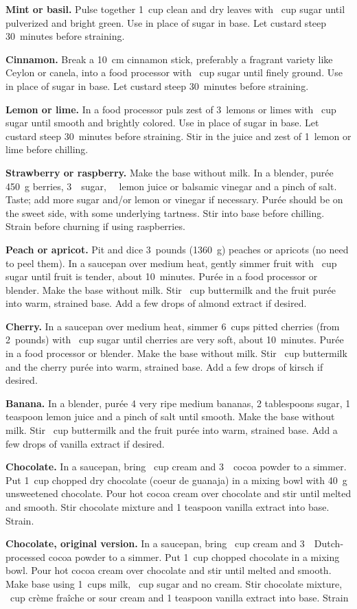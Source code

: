 \textbf{Mint or basil.}  Pulse together 1~cup clean and dry leaves
with \fracTT~cup sugar until pulverized and bright green.  Use in
place of sugar in base.  Let custard steep 30~minutes before
straining.

\textbf{Cinnamon.}  Break a 10~cm cinnamon stick, preferably a
fragrant variety like Ceylon or canela, into a food processor with
\fracTT~cup sugar until finely ground.  Use in place of sugar in base.
Let custard steep 30~minutes before straining.

\textbf{Lemon or lime.}  In a food processor puls zest of 3~lemons or
limes with \fracTT~cup sugar until smooth and brightly colored.  Use
in place of sugar in base.  Let custard steep 30~minutes before
straining.  Stir in the juice and zest of 1~lemon or lime before
chilling.

\textbf{Strawberry or raspberry.}  Make the base without milk. In a
blender, purée 450~g berries, 3~\tbsp~sugar, \fracH~\tsp~lemon juice
or balsamic vinegar and a pinch of salt. Taste; add more sugar and/or
lemon or vinegar if necessary. Purée should be on the sweet side, with
some underlying tartness. Stir into base before chilling. Strain
before churning if using raspberries.

\textbf{Peach or apricot.}  Pit and dice 3~pounds (1360~g) peaches or
apricots (no need to peel them). In a saucepan over medium heat,
gently simmer fruit with \fracH~cup sugar until fruit is tender, about
10~minutes. Purée in a food processor or blender. Make the base
without milk. Stir \fracH~cup buttermilk and the fruit purée into
warm, strained base. Add a few drops of almond extract if
desired.

\textbf{Cherry.}  In a saucepan over medium heat, simmer 6~cups pitted
cherries (from 2~pounds) with \fracT~cup sugar until cherries are very
soft, about 10~minutes. Purée in a food processor or blender. Make the
base without milk. Stir \fracH~cup buttermilk and the cherry purée
into warm, strained base. Add a few drops of kirsch if desired.

\textbf{Banana.}  In a blender, purée 4 very ripe medium bananas, 2
tablespoons sugar, 1 teaspoon lemon juice and a pinch of salt until
smooth. Make the base without milk. Stir \fracH~cup buttermilk and the
fruit purée into warm, strained base. Add a few drops of vanilla
extract if desired.

\textbf{Chocolate.}  In a saucepan, bring \fracQQ~cup cream and
3~\tbsp~cocoa powder to a simmer. Put 1~cup chopped dry chocolate
(coeur de guanaja) in a mixing bowl with 40~g unsweetened chocolate.
Pour hot cocoa cream over chocolate and stir until melted and smooth.
Stir chocolate mixture and 1 teaspoon vanilla extract into base.
Strain.

\textbf{Chocolate, original version.}  In a saucepan, bring
\fracQQ~cup cream and 3~\tbsp~Dutch-processed cocoa powder to a
simmer. Put 1~cup chopped chocolate in a mixing bowl. Pour hot cocoa
cream over chocolate and stir until melted and smooth. Make base using
1\fracH~cups milk, \fracQQ~cup sugar and no cream. Stir chocolate
mixture, \fracQQ~cup crème fraîche or sour cream and 1 teaspoon
vanilla extract into base. Strain

